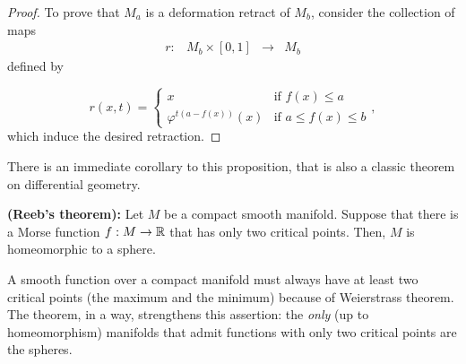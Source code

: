 \begin{proof}
To prove that $M_a$ is a deformation retract of $M_b$, consider the collection of maps
\[\begin{array}{rccc} r : & M_b \times [0,1] & \longrightarrow & M_b \end{array}\]
defined by

\[r(x,t) = \left\{ \begin{array}{ll} x & \text{if } f(x) \leq a \\ \varphi^{t(a-f(x))}(x) & \text{if } a \leq f(x) \leq b \end{array} \right. ,\]
which induce the desired retraction.
\end{proof}

There is an immediate corollary to this proposition, that is also a classic theorem on differential geometry.

\begin{coro} \label{coro:reeb}
{\bf (Reeb's theorem):} Let $M$ be a compact smooth manifold. Suppose that there is a Morse function $f : M \rightarrow \mathbb{R}$ that has only two critical points. Then, $M$ is homeomorphic to a sphere.\end{coro}

\begin{rmrk} A smooth function over a compact manifold must always have at least two critical points (the maximum and the minimum) because of Weierstrass theorem. The theorem, in a way, strengthens this assertion: the {\it only} (up to homeomorphism) manifolds that admit functions with only two critical points are the spheres.
\end{rmrk}

